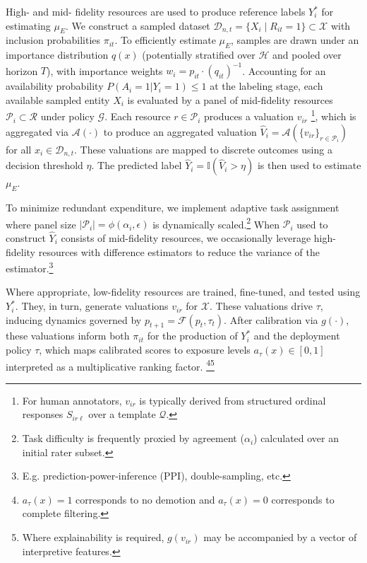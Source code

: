 \documentclass[12pt]{article}
\begin{document}
High- and mid- fidelity resources are used to produce reference labels $Y_i^*$ for estimating $\mu_E$. We construct a sampled dataset $\mathcal{D}_{n,t} = \{X_i \mid R_{it}=1\} \subset \mathcal{X}$ with inclusion probabilities $\pi_{it}$. To efficiently estimate $\mu_E$, samples are drawn under an importance distribution $q(x)$ (potentially stratified over $\mathcal{H}$ and pooled over horizon $T$), with importance weights $w_i = p_{it} \cdot (q_{it})^{-1}$. Accounting for an availability probability $P(A_{i}=1|Y_{i}=1) \leq 1$ at the labeling stage, each available sampled entity $X_i$ is evaluated by a panel of mid-fidelity resources $\mathcal{P}_i \subset \mathcal{R}$ under policy $\mathcal{G}$. Each resource $r \in \mathcal{P}_i$ produces a valuation $v_{ir}$ \footnote{For human annotators, $v_{ir}$ is typically derived from structured ordinal responses $S_{ir\ell}$ over a template $\mathcal{Q}$.}, which is aggregated via $\mathcal{A}(\cdot)$ to produce an aggregated valuation $\hat{V}_{i} = \mathcal{A}(\{v_{ir}\}_{r \in \mathcal{P}_i})$ for all $x_{i} \in \mathcal{D}_{n,t}$. These valuations are mapped to discrete outcomes using a decision threshold $\eta$. The predicted label $\hat{Y}_{i} = \mathbb{I}(\hat{V}_{i}>\eta)$ is then used to estimate $\mu_{E}$.

To minimize redundant expenditure, we implement adaptive task assignment where panel size $|\mathcal{P}_i| = \phi(\alpha_i, \epsilon)$ is dynamically scaled.\footnote{Task difficulty is frequently proxied by agreement ($\alpha_i$) calculated over an initial rater subset.} When $\mathcal{P}_i$ used to construct $\hat{Y}_{i}$ consists of mid-fidelity resources, we occasionally leverage high-fidelity resources with difference estimators to reduce the variance of the estimator.\footnote{E.g. prediction-power-inference (PPI), double-sampling, etc.}

Where appropriate, low-fidelity resources are trained, fine-tuned, and tested using $Y_i^*$. They, in turn, generate valuations $v_{ir}$ for $\mathcal{X}$. These valuations drive $\tau$, inducing dynamics governed by $p_{t+1} = \mathcal{F}(p_t, \tau_t)$. After calibration via $g(\cdot)$, these valuations inform both $\pi_{it}$ for the production of $Y_i^*$ and the deployment policy $\tau$, which maps calibrated scores to exposure levels $a_\tau(x) \in [0,1]$ interpreted as a multiplicative ranking factor. \footnote{$a_\tau(x)=1$ corresponds to no demotion and $a_\tau(x)=0$ corresponds to complete filtering.}\footnote{Where explainability is required, $g(v_{ir})$ may be accompanied by a vector of interpretive features.}
\end{document}
